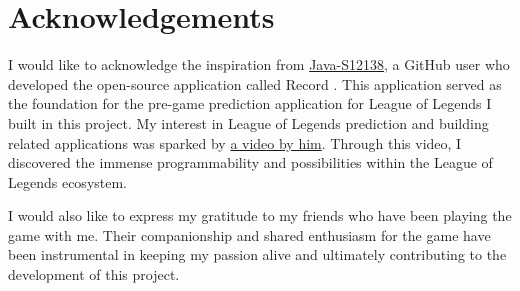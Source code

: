 \documentclass[11pt,a4paper,oneside]{report}
\newcommand{\instructions}[1]{{\color{orange}\itshape #1}}
\renewcommand{\instructions}[1]{}
\begin{document}
\vspace{4\bigskipamount}


\chapter*{Acknowledgements}
\label{acknowledgements}

\instructions{Individuals and organizations who helped with the research project
  and provided financing are thanked in a paragraph of the thesis. Do not
  include individual titles in the acknowledgments. However, it is
  appropriate to state grant numbers and sponsors. Examples would like
  SELF, SRS, SW Grants, etc.}

I would like to acknowledge the inspiration from \href{https://github.com/Java-S12138}{Java-S12138}, a GitHub user who developed the open-source application called Record \cite{record}. This application served as the foundation for the pre-game prediction application for League of Legends I built in this project. My interest in League of Legends prediction and building related applications was sparked by \href{https://www.bilibili.com/video/BV1nU4y1D7FQ/}{a video by him}. Through this video, I discovered the immense programmability and possibilities within the League of Legends ecosystem.


I would also like to express my gratitude to my friends who have been playing the game with me. Their companionship and shared enthusiasm for the game have been instrumental in keeping my passion alive and ultimately contributing to the development of this project.

\newpage


\setcounter{tocdepth}{1}
\listoffigures\newpage
\end{document}
